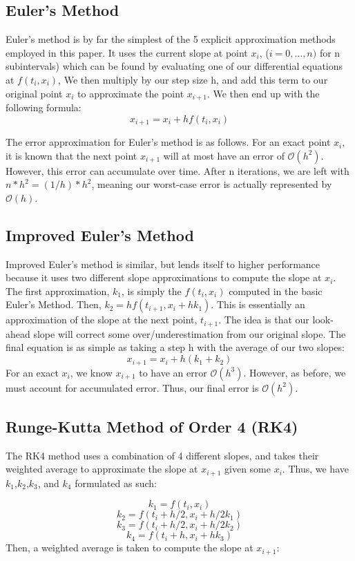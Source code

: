 \subsection{Euler's Method}
Euler's method is by far the simplest of the 5 explicit approximation 
methods employed in this paper. It uses the current slope at point $x_i$, ($i = 0, \dots, n)$ for n subintervals) which can be found by evaluating one of our differential equations at $f(t_i, x_i)$, We then multiply by our step size h, and add this term to our original point $x_i$ to approximate the point $x_{i+1}$. We then end up with the following formula: $$x_{i+1}=x_i+hf(t_i, x_i)$$

The error approximation for Euler's method is as follows. For an exact 
point $x_i$, it is known that the next point $x_{i+1}$ will at most have an error of $\mathcal{O}(h^2)$. However, this error can accumulate over time. After n iterations, we are left with $n*h^2 = (1/h)*h^2$, meaning our worst-case error is actually represented by $\mathcal{O}(h)$.

\subsection{Improved Euler's Method}
Improved Euler's method is similar, but lends itself to higher 
performance because it uses two different slope approximations to compute the slope at $x_i$. The first approximation, $k_1$, is simply the $f(t_i,x_i)$ computed in the basic Euler's Method. 
Then, $k_2 = hf(t_{i+1}, x_i +hk_1)$. 
This is essentially an approximation of the slope at the next point, $t_{i+1}$. 
The idea is that our look-ahead slope will correct some over/underestimation from our original slope. 
The final equation is as simple as taking a step h with the average of our two slopes: 
$$x_{i+1}=x_i+h(k_1+k_2)$$ 
For an exact $x_i$, we know $x_{i+1}$ to have an error $\mathcal{O}(h^3)$. 
However, as before, we must account for accumulated error. Thus, our final error is $\mathcal{O}(h^2)$.


\subsection{Runge-Kutta Method of Order 4 (RK4)}
The RK4 method uses a combination of 4 different slopes, and takes their weighted average to approximate the slope at $x_{i+1}$ given some $x_i$. Thus, we have $k_1$,$k_2$,$k_3$, and $k_4$ formulated as such: 

\begin{equation}
    \label{k1} k_1=f(t_i,x_i)
\end{equation}
\begin{equation}
    \label{k1} k_2=f(t_i+h/2,x_i+h/2k_1)
\end{equation}
\begin{equation}
    \label{k1} k_3=f(t_i+h/2,x_i+h/2k_2)
\end{equation}
\begin{equation}
    \label{k1} k_4=f(t_i+h,x_i+hk_3)
\end{equation}
Then, a weighted average is taken to compute the slope at $x_{i+1}$:

